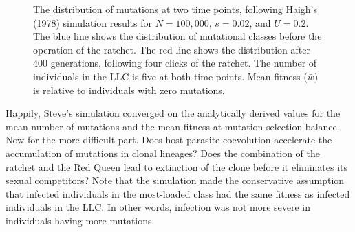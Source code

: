 \documentclass[
  letterpaper,
]{book}
\begin{document}
\begin{figure}


\caption[The distribution of mutations at two time points following
Haigh's simulation results]{\label{fig-6-2}The distribution of mutations
at two time points, following Haigh's (1978) simulation results for
\(N = 100,000\), \(s = 0.02\), and \(U = 0.2\). The blue line shows the
distribution of mutational classes before the operation of the ratchet.
The red line shows the distribution after 400 generations, following
four clicks of the ratchet. The number of individuals in the LLC is five
at both time points. Mean fitness (\(\bar{w}\)) is relative to
individuals with zero mutations.}

\end{figure}%

Happily, Steve's simulation converged on the analytically derived values
for the mean number of mutations and the mean fitness at
mutation-selection balance. Now for the more difficult part. Does
host-parasite coevolution accelerate the accumulation of mutations in
clonal lineages? Does the combination of the ratchet and the Red Queen
lead to extinction of the clone before it eliminates its sexual
competitors? Note that the simulation made the conservative assumption
that infected individuals in the most-loaded class had the same fitness
as infected individuals in the LLC. In other words, infection was not
more severe in individuals having more mutations.
\end{document}
